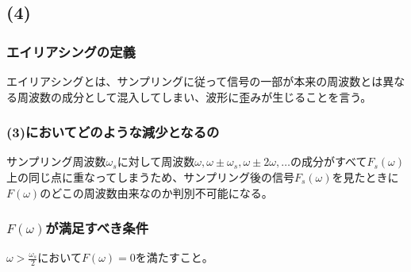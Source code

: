\documentclass[a4paper,12pt,xelatex,ja=standard]{bxjsarticle}
\begin{document}
\subsection*{(4)}
\subsubsection*{エイリアシングの定義}
エイリアシングとは、サンプリングに従って信号の一部が本来の周波数とは異なる周波数の成分として混入してしまい、波形に歪みが生じることを言う。\\

\subsubsection*{(3)においてどのような減少となるの}
サンプリング周波数$\omega_s$に対して周波数$\omega, \omega \pm \omega_s, \omega \pm 2\omega, \dots$の成分がすべて$F_s(\omega)$上の同じ点に重なってしまうため、サンプリング後の信号$F_s(\omega)$を見たときに$F(\omega)$のどこの周波数由来なのか判別不可能になる。

\subsubsection*{$F(\omega)$が満足すべき条件}
$\omega > \frac{\omega_s}{2}$において$F(\omega) = 0$を満たすこと。
\end{document}
